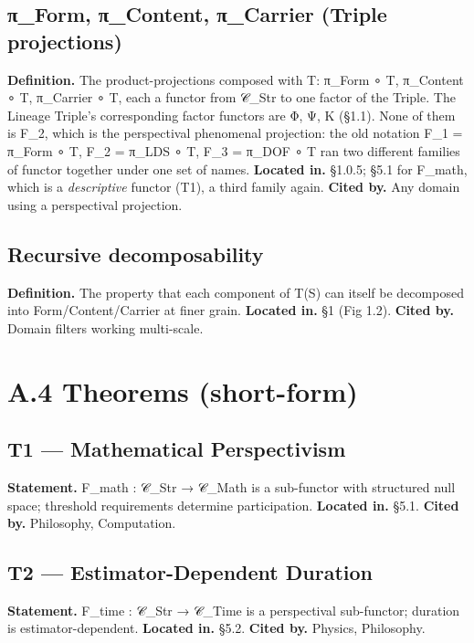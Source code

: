\documentclass[11pt, openany]{book}
\newcommand{\sectionbreak}{\clearpage}
\begin{document}
\subsection{π\_\allowbreak{}Form, π\_\allowbreak{}Content, π\_\allowbreak{}Carrier (Triple projections)}
\textbf{Definition.} The product-projections composed with T: π\_\allowbreak{}Form ∘ T, π\_\allowbreak{}Content ∘ T, π\_\allowbreak{}Carrier ∘ T, each a functor from 𝒞\_\allowbreak{}Str to one factor of the Triple. The Lineage Triple's corresponding factor functors are Φ, Ψ, Κ (§1.1). None of them is F\_\allowbreak{}2, which is the perspectival phenomenal projection: the old notation F\_\allowbreak{}1 = π\_\allowbreak{}Form ∘ T, F\_\allowbreak{}2 = π\_\allowbreak{}LDS ∘ T, F\_\allowbreak{}3 = π\_\allowbreak{}DOF ∘ T ran two different families of functor together under one set of names.
\textbf{Located in.} §1.0.5; §5.1 for F\_\allowbreak{}math, which is a \textit{descriptive} functor (T1), a third family again.
\textbf{Cited by.} Any domain using a perspectival projection.

\subsection{Recursive decomposability}
\textbf{Definition.} The property that each component of T(S) can itself be decomposed into Form/Content/Carrier at finer grain.
\textbf{Located in.} §1 (Fig 1.2).
\textbf{Cited by.} Domain filters working multi-scale.

\sectionbreak

\section{A.4 Theorems (short-form)}

\subsection{T1 --- Mathematical Perspectivism}
\textbf{Statement.} F\_\allowbreak{}math : 𝒞\_\allowbreak{}Str → 𝒞\_\allowbreak{}Math is a sub-functor with structured null space; threshold requirements determine participation.
\textbf{Located in.} §5.1.
\textbf{Cited by.} Philosophy, Computation.

\subsection{T2 --- Estimator-Dependent Duration}
\textbf{Statement.} F\_\allowbreak{}time : 𝒞\_\allowbreak{}Str → 𝒞\_\allowbreak{}Time is a perspectival sub-functor; duration is estimator-dependent.
\textbf{Located in.} §5.2.
\textbf{Cited by.} Physics, Philosophy.
\end{document}
